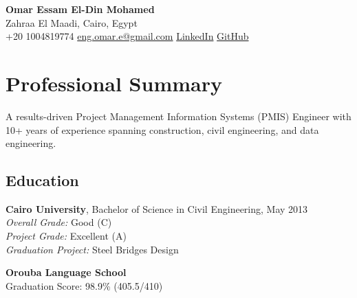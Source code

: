 \documentclass[10pt, letterpaper]{article}
\newcommand{\firstpagestart}{
    \setlength{\baselineskip}{1.2\baselineskip}  %
}
\begin{document}
\begin{mdframed}[style=cvframe]
\firstpagestart  %

\begin{center}
    {\LARGE \textbf{Omar Essam El-Din Mohamed}} \\[0.3em]
    {Zahraa El Maadi, Cairo, Egypt} \\[0.2em]
    {\faPhone* \hspace{0.2cm} +20 1004819774} \hspace{0.7cm}
    {\href{mailto:eng.omar.e@gmail.com}{\faEnvelope[regular] \hspace{0.2cm} eng.omar.e@gmail.com}} \hspace{0.7cm}
    {\href{https://www.linkedin.com/in/omar-essam-b602279b}{\faLinkedin \hspace{0.2cm} LinkedIn}} \hspace{0.7cm}
    {\href{https://github.com/omare32}{\faGithub \hspace{0.2cm} GitHub}}
\end{center}

\section{Professional Summary}
A results-driven Project Management Information Systems (PMIS) Engineer with 10+ years of experience spanning construction, civil engineering, and data engineering.

\begin{multicols}{2}
\section{Education}
\textbf{Cairo University}, Bachelor of Science in Civil Engineering, May 2013 \\
\textit{Overall Grade:} Good (C) \\
\textit{Project Grade:} Excellent (A) \\
\textit{Graduation Project:} Steel Bridges Design

\textbf{Orouba Language School} \\
Graduation Score: 98.9\% (405.5/410)


\end{multicols}
\end{mdframed}
\end{document}
